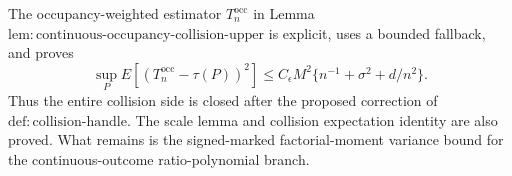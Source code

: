 The occupancy-weighted estimator \(T_n^{\mathrm{occ}}\) in Lemma~\(\mathrm{lem:continuous\text{-}occupancy\text{-}collision\text{-}upper}\) is explicit, uses a bounded fallback, and proves
\[
 \sup_P E[(T_n^{\mathrm{occ}}-\tau(P))^2]
 \le C_{\epsilon}M^2\{n^{-1}+\sigma^2+d/n^2\}.
\]
Thus the entire collision side is closed after the proposed correction of \(\mathrm{def:collision\text{-}handle}\).  The scale lemma and collision expectation identity are also proved.  What remains is the signed-marked factorial-moment variance bound for the continuous-outcome ratio-polynomial branch.